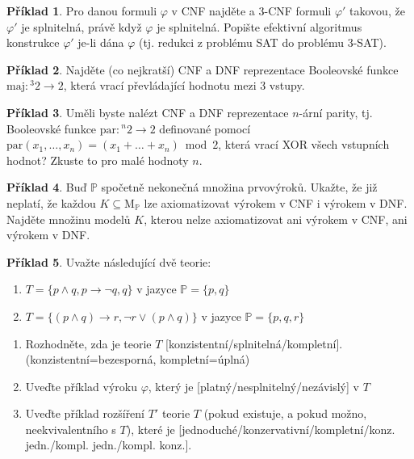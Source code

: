 \documentclass[a4paper]{article}
\theoremstyle{definition}
\newtheorem{problem}{Příklad}
\begin{document}
    
\medskip\begin{problem} Pro danou formuli $\varphi$ v CNF najděte a 3-CNF formuli $\varphi'$ takovou, že $\varphi'$ je splnitelná, právě když $\varphi$ je splnitelná. Popište efektivní algoritmus konstrukce $\varphi'$ je-li dána $\varphi$ (tj. redukci z problému SAT do problému 3-SAT).
\end{problem}
    
    
\medskip\begin{problem} Najděte (co nejkratší) CNF a DNF reprezentace Booleovské funkce $\mathrm{maj}: {^3}2\to 2$, která vrací převládající hodnotu mezi 3 vstupy.
\end{problem}
    
    
\medskip\begin{problem} Uměli byste nalézt CNF a DNF reprezentace $n$-ární parity, tj. Booleovské funkce $\mathrm{par}: {^n}2\to 2$ definované pomocí $\mathrm{par}(x_1,\dots,x_n)=(x_1+\dots+x_n)\bmod 2$,
která vrací XOR všech vstupních hodnot? Zkuste to pro malé hodnoty $n$.
\end{problem}
    
    
\medskip\begin{problem} Buď $\mathbb P$ spočetně nekonečná množina prvovýroků. Ukažte, že již neplatí, že každou $K\subseteq \mathrm{M}_\mathbb P$ lze axiomatizovat výrokem v CNF i výrokem v DNF. Najděte množinu modelů $K$, kterou nelze axiomatizovat ani výrokem v CNF, ani výrokem v DNF.
\end{problem}


\medskip\begin{problem}
Uvažte následující dvě teorie:
\begin{enumerate}[label=(\Roman*)]
    \item $T=\{p\wedge q,p\to\neg q,q\}$ v jazyce $\mathbb P=\{p,q\}$
    \item $T=\{(p\wedge q)\to r, \neg r\vee(p\wedge q)\}$ v jazyce $\mathbb P=\{p,q,r\}$        
\end{enumerate}
\begin{enumerate}
    \item Rozhodněte, zda je teorie $T$ [konzistentní/splnitelná/kompletní]. (konzistentní=bezesporná, kompletní=úplná)
    \item Uveďte příklad výroku $\varphi$, který je [platný/nesplnitelný/nezávislý] v $T$
    \item Uveďte příklad rozšíření $T'$ teorie $T$ (pokud existuje, a pokud možno, neekvivalentního s $T$), které je [jednoduché/konzervativní/kompletní/konz. jedn./kompl. jedn./kompl. konz.].
\end{enumerate}

\end{problem}
        
\end{document}
